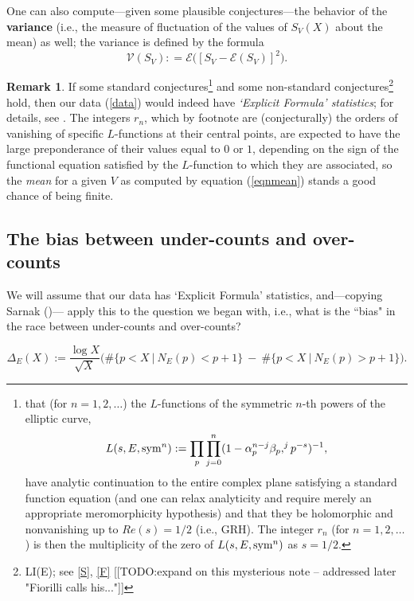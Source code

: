 \documentclass[11pt]{article}
\theoremstyle{plain}
\theoremstyle{definition}
\newtheorem{remark}[theorem]{Remark}
\numberwithin{equation}{section}
\numberwithin{figure}{section}
\numberwithin{table}{section}
\begin{document}
\bigskip
One can also compute---given some plausible conjectures---the behavior of the {\bf variance}  (i.e., the measure of fluctuation of the values of $S_V(X)$ about the mean) as well; the variance is defined by the formula  $${\mathcal V}(S_V): = {\mathcal E}\big([S_V  - {\mathcal E}(S_V)]^2\big).$$


\begin{remark}  If some standard conjectures{\footnote{that (for $n=1,2,\dots$) the $L$-functions of the symmetric $n$-th powers of the elliptic curve, \begin{equation}
L(s, E, {\rm sym}^n): = \prod_p\prod_{j=0}^n(1- \alpha_p^{n-j}\beta_p,^jp^{-s})^{-1},
\end{equation} have analytic continuation   to the entire complex plane satisfying a standard function equation (and one can relax analyticity and require merely an appropriate meromorphicity hypothesis) and that they be holomorphic and nonvanishing up to $Re(s) =1/2$ (i.e., GRH).  The integer $r_n$ (for $n=1,2,\dots$)  is then the multiplicity of the zero of $L(s, E, {\rm sym}^n)$ as $s=1/2$. \vskip20pt }} and some non-standard conjectures{\footnote{LI(E); see  \ref{S}, \ref{F} [[TODO:expand on this mysterious note -- addressed later "Fiorilli calls his..."]]}}  hold, then our data (\ref{data}) would indeed have {\it `Explicit Formula' statistics}; for details, see \cite{S}.  The integers $r_n$, which by footnote  \label{footnote:statdist} are (conjecturally) the orders of vanishing of specific $L$-functions at their central points, are expected to have the large preponderance of their values equal to  $0$ or $1$, depending on the sign of the functional equation satisfied by the $L$-function to which they are associated,  so the {\it mean} for  a given $V$ as computed by equation (\ref{eqnmean}) stands a good chance of being finite.
\end{remark}


\subsection{The bias between under-counts and over-counts}
  We will assume that our data has `Explicit Formula' statistics, and---copying Sarnak ({\cite{S}})--- apply this to the question we began with, i.e., what is the ``bias" in the race between under-counts and over-counts?

$$\Delta_E(X):={\frac{\log X}{\sqrt X}}\big(\#\{ p < X\ | \ N_E(p) < p+1\}\ - \ \#\{ p < X\ | \ N_E(p) > p+1\}\big).$$
\end{document}
